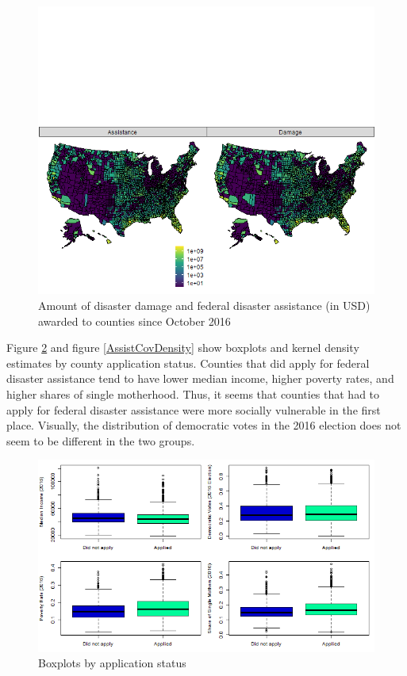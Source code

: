 \begin{figure}[!h]
	\centering
	\includegraphics[scale=0.7]{"../Code & Data/AssistanceMap.png"}
	\caption{Amount of disaster damage and federal disaster assistance (in USD) awarded to counties since October 2016}
	\label{AssistanceMap}
\end{figure}


Figure \ref{AssistCovBoxplot} and figure \ref{AssistCovDensity} show boxplots and kernel density estimates by county application status. Counties that did apply for federal disaster assistance tend to have lower median income, higher poverty rates, and higher shares of single motherhood. Thus, it seems that counties that had to apply for federal disaster assistance were more socially vulnerable in the first place. Visually, the distribution of democratic votes in the 2016 election does not seem to be different in the two groups.



\begin{figure}[!h]
	\centering
	\includegraphics[scale=0.7]{"../Code & Data/AssistanceCovBoxplot.png"}
	\caption{Boxplots by application status}
	\label{AssistCovBoxplot}
\end{figure}



